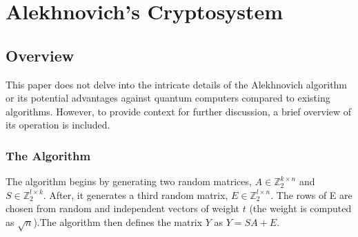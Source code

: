\chapter{Alekhnovich's Cryptosystem}
\section{Overview}
This paper does not delve into the intricate details of the Alekhnovich algorithm or its potential advantages against quantum computers compared to existing algorithms. However, to provide context for further discussion, a brief overview of its operation is included.
\subsection{The Algorithm} The algorithm begins by generating two random matrices, $A\in \mathbb{Z}^{k\times n}_2$ and $S\in \mathbb{Z}^{l\times k}_2$. After, it generates a third random matrix, $E\in \mathbb{Z}^{l\times n}_2$. The rows of E are chosen from random and independent vectors of weight $t$ (the weight is computed as $\sqrt{n}$).The algorithm then defines the matrix $Y$ as $Y = SA + E$.


